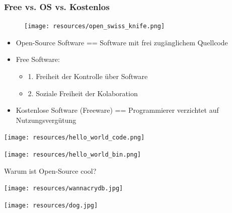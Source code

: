 \begin{frame}
\frametitle{Free vs. OS vs. Kostenlos}
\begin{figure}
\texttt{[image: resources/open\_swiss\_knife.png]}
\end{figure}
\begin{itemize}
	\item Open-Source Software == Software mit frei zugänglichem Quellcode
	\item Free Software:
	\begin{itemize}
		\item 1. Freiheit der Kontrolle über Software
		\item 2. Soziale Freiheit der Kolaboration
	\end{itemize}
	\item Kostenlose Software (Freeware) == Programmierer verzichtet auf Nutzungsvergütung
\end{itemize}

\end{frame}

\begin{frame}
\centering\texttt{[image: resources/hello\_world\_code.png]}
\end{frame}

\begin{frame}
\centering\texttt{[image: resources/hello\_world\_bin.png]}
\end{frame}

\begin{frame}
	\centering\Huge Warum ist Open-Source cool?
\end{frame}

\begin{frame}
	\centering\texttt{[image: resources/wannacrydb.jpg]}
\end{frame}

\begin{frame}
	\centering\texttt{[image: resources/dog.jpg]}
\end{frame}

